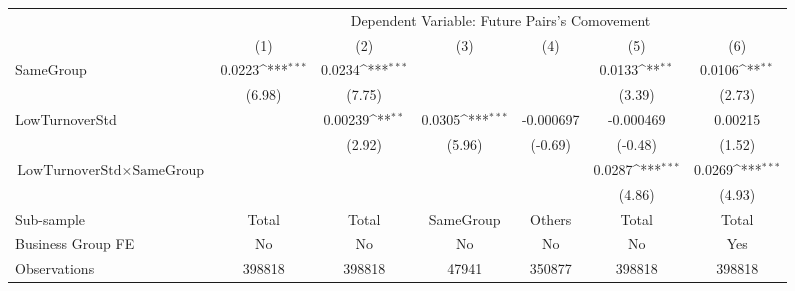 {
\def\sym#1{\ifmmode^{#1}\else\(^{#1}\)\fi}
\begin{tabular}{l*{6}{c}}
\hline\hline
                &\multicolumn{6}{c}{Dependent Variable:  Future Pairs's Comovement}                                               \\\cmidrule(lr){2-7}
                &\multicolumn{1}{c}{(1)}         &\multicolumn{1}{c}{(2)}         &\multicolumn{1}{c}{(3)}         &\multicolumn{1}{c}{(4)}         &\multicolumn{1}{c}{(5)}         &\multicolumn{1}{c}{(6)}         \\
\hline
SameGroup       &   0.0223\sym{***}&   0.0234\sym{***}&                  &                  &   0.0133\sym{**} &   0.0106\sym{**} \\
                &   (6.98)         &   (7.75)         &                  &                  &   (3.39)         &   (2.73)         \\
[1em]
LowTurnoverStd  &                  &  0.00239\sym{**} &   0.0305\sym{***}&-0.000697         &-0.000469         &  0.00215         \\
                &                  &   (2.92)         &   (5.96)         &  (-0.69)         &  (-0.48)         &   (1.52)         \\
[1em]
$ {\text{LowTurnoverStd} } \times {\text{SameGroup} }  $ &                  &                  &                  &                  &   0.0287\sym{***}&   0.0269\sym{***}\\
                &                  &                  &                  &                  &   (4.86)         &   (4.93)         \\
\hline
Sub-sample      &    Total         &    Total         &SameGroup         &   Others         &    Total         &    Total         \\
Business Group FE&       No         &       No         &       No         &       No         &       No         &      Yes         \\
Observations    &   398818         &   398818         &    47941         &   350877         &   398818         &   398818         \\
\hline\hline  \end{tabular}}
